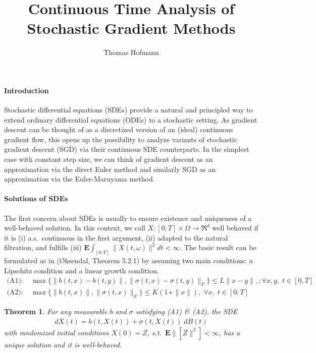 \documentclass{article}
\author{Thomas Hofmann}
\title{Continuous Time Analysis of \\ Stochastic Gradient Methods}
\newcommand{\E}{{\mathbf E}}
\newtheorem{theorem}{Theorem}
\begin{document}
\maketitle 

\paragraph{Introduction} Stochastic differential equations (SDEs) provide a natural and principled way to extend ordinary differential equations (ODEs) to a stochastic setting. As gradient descent can be thought of as a discretized version of an (ideal) continuous gradient flow, this opens up the possibility to analyze variants of stochastic gradient descent (SGD) via their continuous SDE counterparts. In the simplest case with constant step size, we can think of gradient descent as an approximation via the direct Euler method and similarly SGD as an approximation via the Euler-Maruyama method.

\paragraph{Solutions of SDEs} The first concern about SDEs is usually to ensure existence and uniqueness of a well-behaved solution. In this context, we call $X: [0;T] \times \Omega \to \Re^d$ well behaved if it is (i) a.s.~continuous in the first argument, (ii) adapted to the natural filtration, and fulfills (iii) $\E  \int_{[0:T]} \| X(t,\omega)\|^2 dt< \infty$. The basic result can be formulated as in ({\O}ksendal, Theorem 5.2.1) by assuming two main conditions: a Lipschitz condition and a linear growth condition.
\begin{align*}
\text{(A1):} \; & \max\{\| b(t, x) -b(t, y) \|,\| \sigma(t, x) -\sigma(t, y)\|_F\} \le  L\|x-y\|, ; \forall x, y, \; t \in [0, T]\\
\text{(A2):} \; &  \max\{\| b(t, x) \|, \| \sigma(t, x) \|_F\} \le K (1 + \| x\|), \; \forall x, \; t \in [0;T]
\end{align*}

\begin{theorem} For any measurable $b$ and $\sigma$ satisfying (A1) \& (A2), the SDE 
\begin{align}
dX(t)  = b(t,X(t)) + \sigma(t,X(t)) \; dB(t)
\label{eq:sde}
\end{align}
with randomized initial conditions $X(0) = Z$, s.t.~$\E\|[Z\|^2] < \infty$, has a unique solution and it is well-behaved.
\end{theorem}
\end{document}
